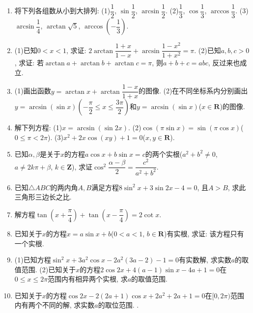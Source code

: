 \documentclass[10pt,a4paper]{article}
\begin{document}
\begin{enumerate}[1.]
\item 将下列各组数从小到大排列:
(1)$\dfrac 12$, $\sin \dfrac 12$, $\arcsin \dfrac 12$.				(2)$\dfrac 13$, $\cos \dfrac 13$, $\arccos \dfrac 13$.
(3)$\arcsin \dfrac 14$, $\arctan \sqrt 5$, $\arccos (-\dfrac 13)$.
\item (1)已知$0<x<1$, 求证: $2\arctan \dfrac{1+x}{1-x}+\arcsin \dfrac{1-x^2}{1+x^2}=\pi$.
(2)已知$a,b,c>0$, 求证: 若$\arctan a+\arctan b+\arctan c=\pi$, 则$a+b+c=abc$, 反过来也成立.
\item (1)画出函数$y=\arctan x+\arctan \dfrac{1-x}{1+x}$的图像.
(2)在不同坐标系内分别画出$y=\arcsin (\sin x)(-\dfrac{\pi }2\le x\le \dfrac{3\pi }2)$和$y=\arcsin (\sin x)$($x\in \mathbf{R}$)的图像.
\item 解下列方程:
(1)$x=\arcsin (\sin 2x)$.
(2)$\cos (\pi \sin x)=\sin (\pi \cos x)$($0\le \pi <2\pi$).
(3)$x^2+2x\cos (xy)+1=0$($x,y\in \mathbf{R}$).
\item 已知$\alpha ,\beta$是关于$x$的方程$a\cos x+b\sin x=c$的两个实根($a^2+b^2\ne 0$, $a\ne 2k\pi +\beta$, $k\in \mathbf{Z}$), 求证$\cos ^2\dfrac{\alpha -\beta}2=\dfrac{c^2}{a^2+b^2}$.
\item 已知$\triangle ABC$的两内角$A,B$满足方程$8\sin ^2x+3\sin 2x-4=0$, 且$A>B$, 求此三角形三边长之比.
\item 解方程$\tan (x+\dfrac{\pi }4)+\tan (x-\dfrac{\pi }4)=2\cot x$.
\item 已知关于$x$的方程$x=a\sin x+b$($0<a<1$, $b\in \mathbf{R}$)有实根, 求证: 该方程只有一个实根.
\item (1)已知方程$\sin ^2x+3a^2\cos x-2a^2(3a-2)-1=0$有实数解, 求实数$a$的取值范围.
(2)已知关于$x$的方程$2\cos 2x+4(a-1)\sin x-4a+1=0$在$0\le x\le 2\pi$范围内有相异两个实根, 求$a$的取值范围.
\item 已知关于$x$的方程$\cos 2x-2(2a+1)\cos x+2a^2+2a+1=0$在$[0,2\pi)$范围内有两个不同的解, 求实数$a$的取位范围.
.



\end{enumerate}
\end{document}
